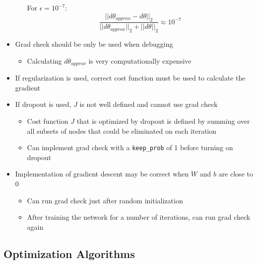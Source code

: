 \documentclass[12pt, letterpaper]{article}
\begin{document}
\begin{itemize}
\begin{enumerate}
            For $\epsilon=10^{-7}$:
            $$\frac{||d\theta_{approx}-d\theta||_2}{||d\theta_{approx}||_2+||d\theta||_2}\approx 10^{-7}$$
        \end{enumerate}
        \item Grad check should be only be used when debugging
        \begin{itemize}
            \item Calculating $d\theta_{approx}$ is very computationally expensive
        \end{itemize}
        \item If regularization is used, correct cost function must be used to calculate the gradient
        \item If dropout is used, $J$ is not well defined and cannot use grad check
        \begin{itemize}
            \item Cost function $J$ that is optimized by dropout is defined by summing over all subsets of nodes that could be eliminated on each iteration
            \item Can implement grad check with a \texttt{keep\_prob} of 1 before turning on dropout
        \end{itemize}
        \item Implementation of gradient descent may be correct when $W$ and $b$ are close to 0
        \begin{itemize}
            \item Can run grad check just after random initialization
            \item After training the network for a number of iterations, can run grad check again
        \end{itemize}
    \end{itemize}

    \subsection{Optimization Algorithms}
\end{document}
